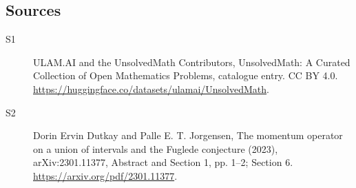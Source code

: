 \documentclass[11pt]{article}
\begin{document}
\subsection{Sources}
\begin{description}
\item[\hypertarget{source:statement:1}{S1}] ULAM.AI and the UnsolvedMath Contributors, UnsolvedMath: A Curated Collection of Open Mathematics Problems, catalogue entry. CC BY 4.0. \url{https://huggingface.co/datasets/ulamai/UnsolvedMath}.
\item[\hypertarget{source:statement:2}{S2}] Dorin Ervin Dutkay and Palle E. T. Jorgensen, The momentum operator on a union of intervals and the Fuglede conjecture (2023), arXiv:2301.11377, Abstract and Section 1, pp. 1–2; Section 6. \url{https://arxiv.org/pdf/2301.11377}.
\end{description}
\label{end:statement}
\end{document}
